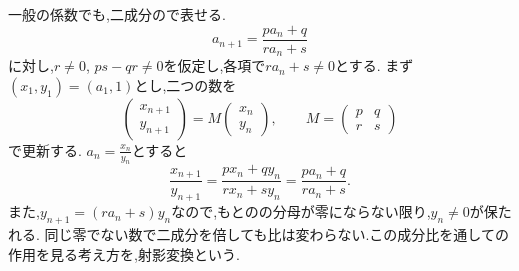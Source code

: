 一般の係数でも,二成分ので表せる.
\[
  a_{n+1}=\frac{pa_n+q}{ra_n+s}
\]
に対し,$r\ne0$, $ps-qr\ne0$を仮定し,各項で$ra_n+s\ne0$とする.
まず$(x_1,y_1)=(a_1,1)$とし,二つの数を
\[
  \begin{pmatrix}x_{n+1}\\y_{n+1}\end{pmatrix}
  =
  M\begin{pmatrix}x_n\\y_n\end{pmatrix},
  \qquad
  M=\begin{pmatrix}p&q\\r&s\end{pmatrix}
\]
で更新する.
$\displaystyle a_n=\frac{x_n}{y_n}$とすると
\[
  \frac{x_{n+1}}{y_{n+1}}
  =\frac{px_n+qy_n}{rx_n+sy_n}
  =\frac{pa_n+q}{ra_n+s}.
\]
また,$y_{n+1}=(ra_n+s)y_n$なので,もとのの分母が零にならない限り,$y_n\ne0$が保たれる.
同じ零でない数で二成分を倍しても比は変わらない.この成分比を通しての作用を見る考え方を,射影変換という.

